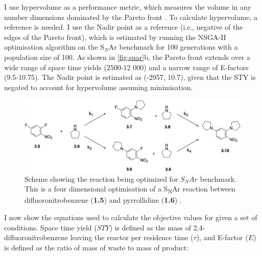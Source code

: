 I use hypervolume as a performance metric, which measures the volume in any number dimensions dominated by the Pareto front \cite{Emmerich2016}. To calculate hypervolume, a reference is needed. I use the Nadir point as a reference (i.e., negative of the edges of the Pareto front), which is estimated by running the NSGA-II optimisation algorithm \cite{Deb2002} on the S$_N$Ar benchmark for 100 generations with a population size of 100. As shown in \ref{fig:snar}b, the Pareto front  extends over a wide range of space time yields (2500-12 000) and a narrow range of E-factors (9.5-10.75). The Nadir point is estimated as (-2957, 10.7), given that the STY is negated to account for hypervolume assuming minimisation.

\begin{figure}
    \centering
    \includegraphics[width=\textwidth]{gfx/Chapter03/snar_benchmark_scheme_thesis.png}
    \caption{Scheme showing the reaction being optimized for $S_NAr$ benchmark. This is a four dimensional optimisation of a  S\textsubscript{N}Ar reaction between difluoronitrobenzene (\textbf{1.5}) and pyrrollidine (\textbf{1.6}) \cite{Hone2017}.}
    \label{fig:snar_benchmark}
\end{figure}

I now show the equations used to calculate the objective values for given a set of conditions. Space time yield ($STY$) is defined as the mass of 2,4-difluoronitrobenzene leaving the reactor per residence time ($\tau$), and E-factor ($E$) is defined as the ratio of mass of waste to mass of product:

